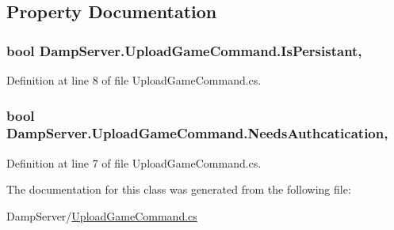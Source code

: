 \subsection{Property Documentation}
\hypertarget{class_damp_server_1_1_upload_game_command_a9c7c283e69f811582a671bad24d3f532}{
\subsubsection[{Is\-Persistant}]{\setlength{\rightskip}{0pt plus 5cm}bool Damp\-Server.\-Upload\-Game\-Command.\-Is\-Persistant\hspace{0.3cm}{\ttfamily [get]}, {\ttfamily [set]}}}\label{class_damp_server_1_1_upload_game_command_a9c7c283e69f811582a671bad24d3f532}


Definition at line 8 of file Upload\-Game\-Command.\-cs.

\hypertarget{class_damp_server_1_1_upload_game_command_a0ec840140ed2fc3f004a060c1d638cd2}{
\subsubsection[{Needs\-Authcatication}]{\setlength{\rightskip}{0pt plus 5cm}bool Damp\-Server.\-Upload\-Game\-Command.\-Needs\-Authcatication\hspace{0.3cm}{\ttfamily [get]}, {\ttfamily [set]}}}\label{class_damp_server_1_1_upload_game_command_a0ec840140ed2fc3f004a060c1d638cd2}


Definition at line 7 of file Upload\-Game\-Command.\-cs.



The documentation for this class was generated from the following file\-:\begin{DoxyCompactItemize}
\item 
Damp\-Server/\hyperlink{_upload_game_command_8cs}{Upload\-Game\-Command.\-cs}\end{DoxyCompactItemize}
